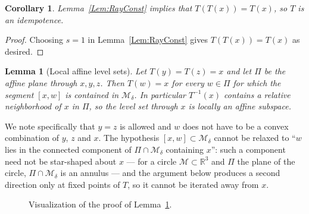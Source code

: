 \documentclass[11pt]{amsart}%
\theoremstyle{plain}
\newtheorem{lemma}[definition]{Lemma}
\newtheorem{corollary}[definition]{Corollary}
\newcommand{\1}{\mathbf{1}}
\newcommand{\M}{\mathcal{M}}
\begin{document}
\begin{corollary}
    Lemma~\ref{Lem:RayConst} implies that $T(T(x)) = T(x)$, so $T$ is an idempotence.
    \label{Cor:T2T}
\end{corollary}

\begin{proof}
    Choosing $s=1$ in Lemma~\ref{Lem:RayConst} gives $T(T(x)) = T(x)$ as desired. 
\end{proof}

\begin{lemma}[Local affine level sets]
    Let $T(y)=T(z)=x$ and let $\Pi$ be the affine plane through $x,y,z$. Then $T(w)=x$ for every
    $w\in\Pi$ for which the segment $[x,w]$ is contained in $\M_\delta$. In particular $T^{-1}(x)$
    contains a relative neighborhood of $x$ in $\Pi$, so the level set through $x$ is locally an
    affine subspace. %
    \label{Lem:AffineLevel}
\end{lemma}

We note specifically that $y=z$ is allowed and $w$ does not have to be a convex combination of
$y$, $z$ and $x$. The hypothesis $[x,w]\subset \M_\delta$ cannot be relaxed to ``$w$ lies in the
connected component of $\Pi\cap \M_\delta$ containing $x$'': such a component need not be
star-shaped about $x$ --- for a circle $\M\subset\mathbb{R}^3$ and $\Pi$ the plane of the circle,
$\Pi\cap \M_\delta$ is an annulus --- and the argument below produces a second direction only at
fixed points of $T$, so it cannot be iterated away from $x$.

\begin{figure}[!ht]
    \centering
    \caption{Visualization of the proof of Lemma~\ref{Lem:AffineLevel}.}
    \label{Fig:VisConstLine}
\end{figure}
\end{document}
